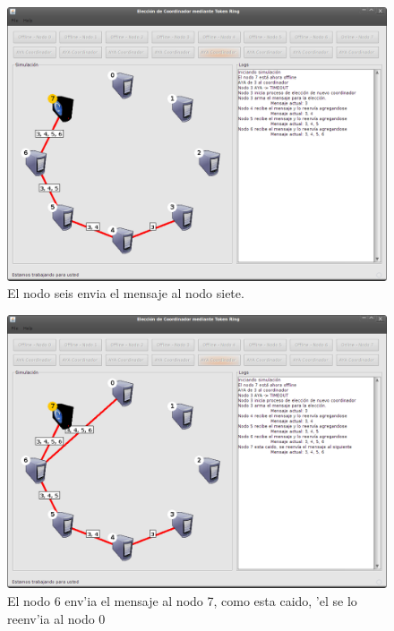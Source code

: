 \begin{figure}[h!]
\centering
 \includegraphics[scale=0.33,keepaspectratio=true]{./imagenes/tokenRing/token3.png}
 \caption{El nodo seis envia el mensaje al nodo siete.}
\end{figure}

\newpage
\begin{figure}[h!]
\centering
 \includegraphics[scale=0.33,keepaspectratio=true]{./imagenes/tokenRing/token4.png}
 \caption{El nodo 6 env'ia el mensaje al nodo 7, como esta caido, 'el se lo reenv'ia al nodo 0}
\end{figure}

